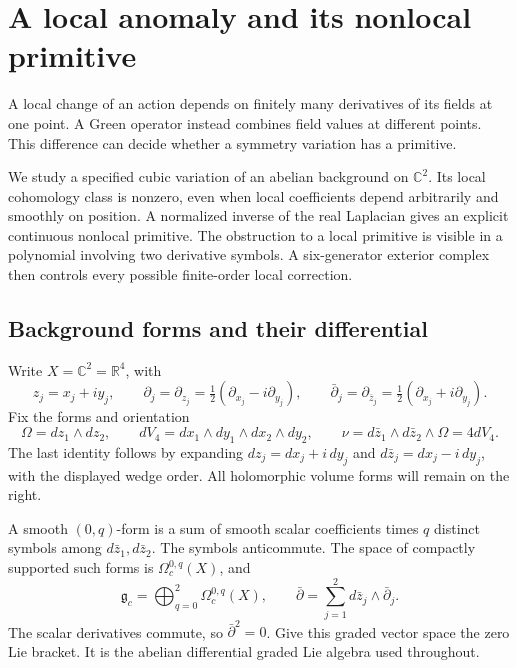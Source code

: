 \chapter{A local anomaly and its nonlocal primitive}
\label{ch:local-anomaly}

A local change of an action depends on finitely many derivatives
of its fields at one point. A Green operator instead combines
field values at different points. This difference can decide
whether a symmetry variation has a primitive.

We study a specified cubic variation of an abelian background on
$\mathbb C^2$. Its local cohomology class is nonzero, even when
local coefficients depend arbitrarily and smoothly on position.
A normalized inverse of the real Laplacian gives an explicit
continuous nonlocal primitive. The obstruction to a local
primitive is visible in a polynomial involving two derivative
symbols. A six-generator exterior complex then controls every
possible finite-order local correction.

\section{Background forms and their differential}
\label{sec:la-background}

Write $X=\mathbb C^2=\mathbb R^4$, with
\[
 z_j=x_j+iy_j,\qquad
 \partial_j=\partial_{z_j}
   =\tfrac12(\partial_{x_j}-i\partial_{y_j}),\qquad
 \bar\partial_j=\partial_{\bar z_j}
   =\tfrac12(\partial_{x_j}+i\partial_{y_j}).
\]
Fix the forms and orientation
\begin{equation}\label{eq:la-volume}
 \Omega=dz_1\wedge dz_2,\qquad
 dV_4=dx_1\wedge dy_1\wedge dx_2\wedge dy_2,\qquad
 \nu=d\bar z_1\wedge d\bar z_2\wedge\Omega=4dV_4.
\end{equation}
The last identity follows by expanding $dz_j=dx_j+i\,dy_j$
and $d\bar z_j=dx_j-i\,dy_j$, with the displayed wedge order.
All holomorphic volume forms will remain on the right.

A smooth $(0,q)$-form is a sum of smooth scalar coefficients
times $q$ distinct symbols among $d\bar z_1,d\bar z_2$.
The symbols anticommute. The space of compactly supported such
forms is $\Omega_c^{0,q}(X)$, and
\[
 \mathfrak g_c=\bigoplus_{q=0}^2\Omega_c^{0,q}(X),\qquad
 \bar\partial=\sum_{j=1}^2d\bar z_j\wedge\bar\partial_j.
\]
The scalar derivatives commute, so $\bar\partial^2=0$.
Give this graded vector space the zero Lie bracket. It is the
abelian differential graded Lie algebra used throughout.

